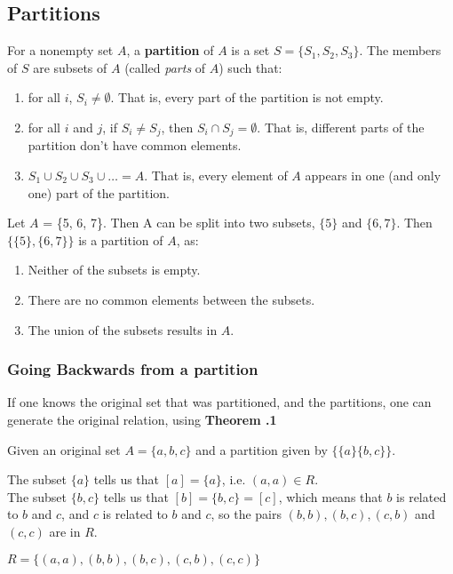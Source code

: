 \documentclass[../notes.tex]{subfiles}
\begin{document}
			\subsection{Partitions}
				For a nonempty set $A$, a \textbf{partition} of $A$ is a set $S = \{S_{1}, S_{2}, S_{3}\}$. The members of $S$ are subsets of $A$ (called \textit{parts} of $A$) such that:
				\begin{enumerate}
					\item for all $i$, $S_{i} \neq \emptyset$. That is, every part of the partition is not empty.
					\item for all $i$ and $j$, if $S_{i} \neq S_{j}$, then $S_{i} \cap S_{j} = \emptyset$. That is, different parts of the partition don't have common elements.
					\item $S_{1} \cup S_{2} \cup S_{3} \cup \ldots = A$. That is, every element of $A$ appears in one (and only one) part of the partition.
				\end{enumerate}
				\begin{example}
					Let $A$ = \{5, 6, 7\}. Then A can be split into two subsets, $\{5\}$ and $\{6, 7\}$. Then $\bigl\{\{5\}, \{6, 7\}\bigr\}$ is a partition of $A$, as:
					\begin{enumerate}
						\item Neither of the subsets is empty.
						\item There are no common elements between the subsets.
						\item The union of the subsets results in $A$.
					\end{enumerate}
				\end{example}
				\subsubsection{Going Backwards from a partition}
					If one knows the original set that was partitioned, and the partitions, one can generate the original relation, using \textbf{Theorem \thechapter.1}
					\begin{example}
						Given an original set $A = \{a, b, c\}$ and a partition given by $\bigl\{\{a\} \{b, c\}\bigr\}$.
						\begin{indentparagraph}
							The subset $\{a\}$ tells us that $[a] = \{a\}$, i.e. $(a, a) \in R$.\\
							The subset $\{b, c\}$ tells us that $[b] = \{b, c\} = [c]$, which means that $b$ is related to $b$ and $c$, and $c$ is related to $b$ and $c$, so the pairs $(b, b), (b, c), (c, b)$ and $(c, c)$ are in $R$.
						\end{indentparagraph}
						$R = \bigl\{(a, a), (b, b), (b, c), (c, b), (c, c)\bigr\}$
					\end{example}
		\pagebreak
\end{document}
